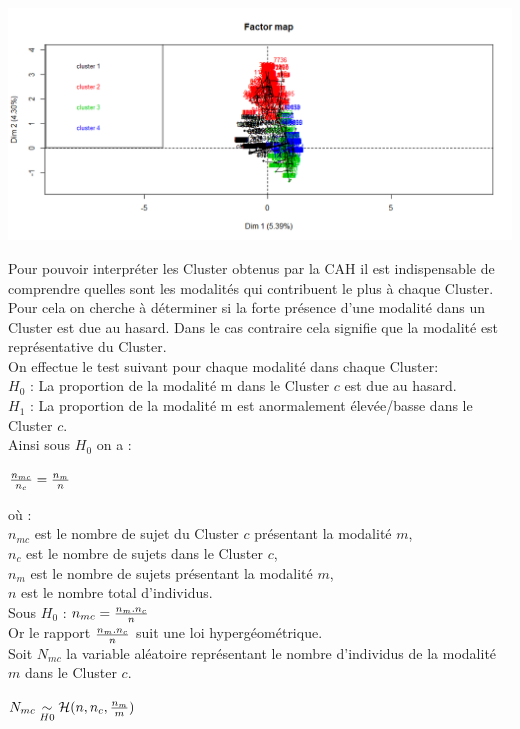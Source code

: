 \documentclass{book}
\begin{document}
\includegraphics[scale = .5]{cah_ind_cluster.png}

\noindent
Pour pouvoir interpréter les Cluster obtenus par la CAH il est indispensable de comprendre quelles sont les modalités qui contribuent le plus à chaque Cluster.\\
Pour cela on cherche à déterminer si la forte présence d'une modalité dans un Cluster est due au hasard. Dans le cas contraire cela signifie que la modalité est représentative du Cluster.\\

\noindent
On effectue le test suivant pour chaque modalité dans chaque Cluster:\\
\noindent 
$H_0$ : La proportion de la modalité m dans le Cluster $c$ est due au hasard.\\
\noindent
$H_1$ : La proportion de la modalité m est anormalement élevée/basse dans le Cluster $c$.\\

\noindent
Ainsi sous $H_0$ on a :
\begin{center}
${{n_{mc}} \over {n_c}} = {{n_m} \over {n}}$
\end{center} 
où :\\
$n_{mc}$ est le nombre de sujet du Cluster $c$ présentant la modalité $m$,\\
$n_c$ est le nombre de sujets dans le Cluster $c$,\\
$n_m$ est le nombre de sujets présentant la modalité $m$,\\
$n$ est le nombre total d'individus.\\
	
\noindent
Sous $H_0$ : $n_{mc}  = {n_m . n_c \over {n}} $\\
Or le rapport ${n_m . n_c \over {n}} $ suit une loi hypergéométrique.\\
Soit $N_{mc}$ la variable aléatoire représentant le nombre d'individus de la modalité $m$ dans le Cluster $c$.
\begin{center}
$ N_{mc} \underset{H0}{\sim} \mathcal{H}(n, n_c, {{n_m}\over {m}})$
\end{center}
\end{document}
